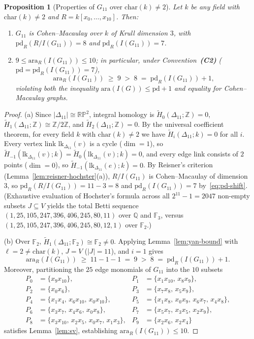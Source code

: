 \documentclass[11pt,a4paper]{amsart}
\theoremstyle{plain}
\newtheorem{proposition}[theorem]{Proposition}
\theoremstyle{definition}
\newcommand{\ara}{\mathrm{ara}}
\newcommand{\pd}{\mathrm{pd}}
\newcommand{\lk}{\mathrm{lk}}
\newcommand{\RP}{\mathbb{RP}}
\newcommand{\FF}{\mathbb{F}}
\newcommand{\QQ}{\mathbb{Q}}
\newcommand{\ZZ}{\mathbb{Z}}
\begin{document}
\begin{proposition}[Properties of $G_{11}$ over $\mathrm{char}(k) \neq 2$]\label{prop:g11}
Let $k$ be any field with $\mathrm{char}(k) \neq 2$ and $R = k[x_0,\dots,x_{10}]$. Then:
\begin{enumerate}
  \item[(a)] $G_{11}$ is Cohen--Macaulay over $k$ of Krull dimension $3$, with $\pd_R(R/I(G_{11})) = 8$ and $\pd_R(I(G_{11})) = 7$.
  \item[(b)] $9 \le \ara_R(I(G_{11})) \le 10$; in particular, under Convention~\textbf{(C2)} ($\pd = \pd_R(I(G_{11})) = 7$),
  \[
    \ara_R(I(G_{11})) \;\ge\; 9 \;>\; 8 \;=\; \pd_R(I(G_{11})) + 1,
  \]
  violating \emph{both} the inequality $\ara(I(G)) \le \pd + 1$ and equality for Cohen--Macaulay graphs.
\end{enumerate}
\end{proposition}

\begin{proof}
(a) Since $|\Delta_{11}| \cong \RP^2$, integral homology is $\widetilde{H}_0(\Delta_{11};\ZZ) = 0$, $\widetilde{H}_1(\Delta_{11};\ZZ) \cong \ZZ/2\ZZ$, and $\widetilde{H}_2(\Delta_{11};\ZZ) = 0$. By the universal coefficient theorem, for every field $k$ with $\mathrm{char}(k) \neq 2$ we have $\widetilde{H}_i(\Delta_{11}; k) = 0$ for all $i$. Every vertex link $\lk_{\Delta_{11}}(v)$ is a cycle ($\dim = 1$), so $\widetilde{H}_{-1}(\lk_{\Delta_{11}}(v); k) = \widetilde{H}_0(\lk_{\Delta_{11}}(v); k) = 0$, and every edge link consists of $2$ points ($\dim = 0$), so $\widetilde{H}_{-1}(\lk_{\Delta_{11}}(e); k) = 0$. By Reisner's criterion (Lemma~\ref{lem:reisner-hochster}(a)), $R/I(G_{11})$ is Cohen--Macaulay of dimension $3$, so $\pd_R(R/I(G_{11})) = 11 - 3 = 8$ and $\pd_R(I(G_{11})) = 7$ by~\eqref{eq:pd-shift}. (Exhaustive evaluation of Hochster's formula across all $2^{11}-1 = 2047$ non-empty subsets $J \subseteq V$ yields the total Betti sequence $(1, 25, 105, 247, 396, 406, 245, 80, 11)$ over $\QQ$ and $\FF_3$, versus $(1, 25, 105, 247, 396, 406, 245, 80, 12, 1)$ over $\FF_2$.)

(b) Over $\FF_2$, $\widetilde{H}_1(\Delta_{11}; \FF_2) \cong \FF_2 \neq 0$. Applying Lemma~\ref{lem:yan-bound} with $\ell = 2 \neq \mathrm{char}(k)$, $J = V$ ($|J| = 11$), and $i = 1$ gives
\[
  \ara_R(I(G_{11})) \;\ge\; 11 - 1 - 1 \;=\; 9 \;>\; 8 \;=\; \pd_R(I(G_{11})) + 1.
\]
Moreover, partitioning the $25$ edge monomials of $G_{11}$ into the $10$ subsets
\begin{align*}
  P_0 &= \{x_9 x_{10}\}, &
  P_1 &= \{x_1 x_{10},\, x_8 x_9\},\\
  P_2 &= \{x_0 x_6\}, &
  P_3 &= \{x_7 x_8,\, x_5 x_9\},\\
  P_4 &= \{x_1 x_4,\, x_6 x_{10},\, x_0 x_{10}\}, &
  P_5 &= \{x_1 x_8,\, x_0 x_9,\, x_6 x_7,\, x_4 x_8\},\\
  P_6 &= \{x_3 x_7,\, x_4 x_6,\, x_0 x_8\}, &
  P_7 &= \{x_5 x_7,\, x_3 x_5,\, x_2 x_9\},\\
  P_8 &= \{x_3 x_{10},\, x_2 x_5,\, x_0 x_7,\, x_1 x_3\}, &
  P_9 &= \{x_2 x_6,\, x_2 x_4\}
\end{align*}
satisfies Lemma~\ref{lem:sv}, establishing $\ara_R(I(G_{11})) \le 10$.
\end{proof}
\end{document}
